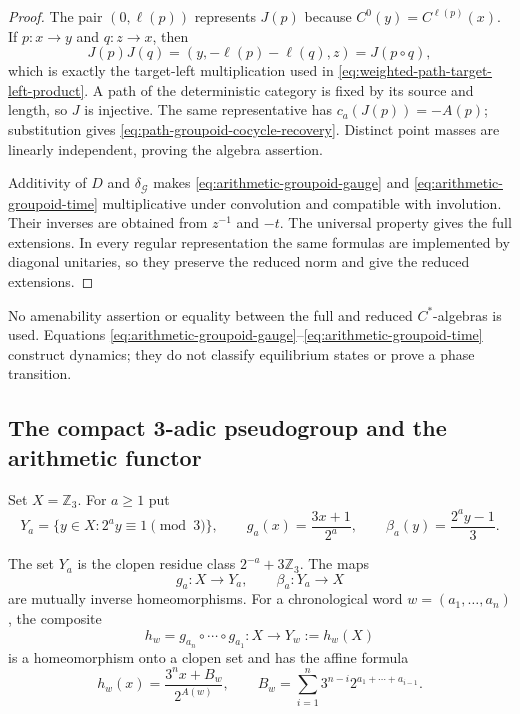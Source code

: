 \begin{proof}
The pair $(0,\ell(p))$ represents $J(p)$ because
$C^0(y)=C^{\ell(p)}(x)$.  If $p:x\to y$ and $q:z\to x$, then
\[
 J(p)J(q)=(y,-\ell(p)-\ell(q),z)=J(p\circ q),
\]
which is exactly the target-left multiplication used in
\eqref{eq:weighted-path-target-left-product}.  A path of the deterministic
category is fixed by its source and length, so $J$ is injective.  The same
representative has $c_a(J(p))=-A(p)$; substitution gives
\eqref{eq:path-groupoid-cocycle-recovery}.  Distinct point masses are
linearly independent, proving the algebra assertion.

Additivity of $D$ and $\delta_{\mathcal G}$ makes
\eqref{eq:arithmetic-groupoid-gauge} and
\eqref{eq:arithmetic-groupoid-time} multiplicative under convolution and
compatible with involution.  Their inverses are obtained from $z^{-1}$ and
$-t$.  The universal property gives the full extensions.  In every regular
representation the same formulas are implemented by diagonal unitaries, so
they preserve the reduced norm and give the reduced extensions.
\end{proof}

\begin{nonclaim}
No amenability assertion or equality between the full and reduced
$C^*$-algebras is used.  Equations
\eqref{eq:arithmetic-groupoid-gauge}--\eqref{eq:arithmetic-groupoid-time}
construct dynamics; they do not classify equilibrium states or prove a phase
transition.
\end{nonclaim}

\subsection{The compact 3-adic pseudogroup and the arithmetic functor}

Set $X=\mathbb Z_3$.  For $a\geq1$ put
\begin{equation}
\label{eq:three-adic-branch-pair}
 Y_a=\{y\in X:2^ay\equiv1\pmod3\},\qquad
 g_a(x)=\frac{3x+1}{2^a},\qquad
 \beta_a(y)=\frac{2^ay-1}{3}.
\end{equation}

\begin{proposition}
\label{prop:three-adic-branch-homeomorphisms}
The set $Y_a$ is the clopen residue class
$2^{-a}+3\mathbb Z_3$.  The maps
\[
 g_a:X\longrightarrow Y_a,
 \qquad \beta_a:Y_a\longrightarrow X
\]
are mutually inverse homeomorphisms.  For a chronological word
$w=(a_1,\ldots,a_n)$, the composite
\[
 h_w=g_{a_n}\circ\cdots\circ g_{a_1}:X\longrightarrow Y_w:=h_w(X)
\]
is a homeomorphism onto a clopen set and has the affine formula
\begin{equation}
\label{eq:three-adic-word-affine}
 h_w(x)=\frac{3^nx+B_w}{2^{A(w)}},
 \qquad
 B_w=\sum_{i=1}^n3^{n-i}2^{a_1+\cdots+a_{i-1}}.
\end{equation}
\end{proposition}

